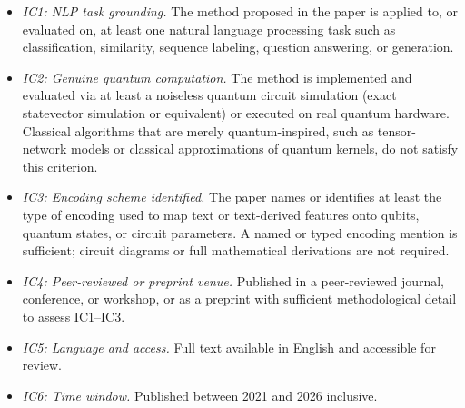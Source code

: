 \documentclass{ieeeaccess}
\begin{document}
\begin{itemize}
    \item \textit{IC1: NLP task grounding.} The method proposed in the paper is applied to, or evaluated on, at least one natural language processing task such as classification, similarity, sequence labeling, question answering, or generation.

    \item \textit{IC2: Genuine quantum computation.} The method is implemented and evaluated via at least a noiseless quantum circuit simulation (exact statevector simulation or equivalent) or executed on real quantum hardware. Classical algorithms that are merely quantum-inspired, such as tensor-network models or classical approximations of quantum kernels, do not satisfy this criterion.

    \item \textit{IC3: Encoding scheme identified.} The paper names or identifies at least the type of encoding used to map text or text-derived features onto qubits, quantum states, or circuit parameters. A named or typed encoding mention is sufficient; circuit diagrams or full mathematical derivations are not required.

    \item \textit{IC4: Peer-reviewed or preprint venue.} Published in a peer-reviewed journal, conference, or workshop, or as a preprint with sufficient methodological detail to assess IC1--IC3.

    \item \textit{IC5: Language and access.} Full text available in English and accessible for review.

    \item \textit{IC6: Time window.} Published between 2021 and 2026 inclusive.
\end{itemize}
\end{document}
